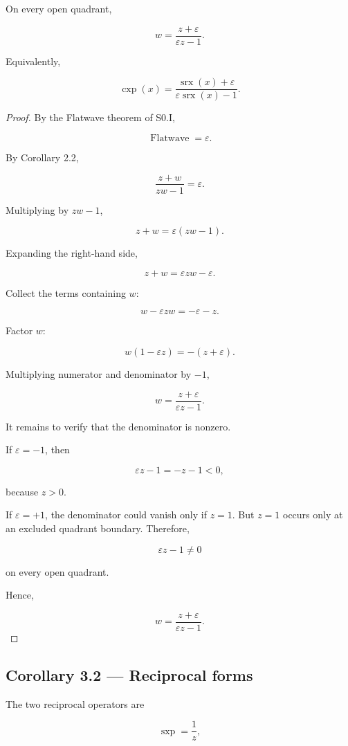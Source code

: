 \documentclass[11pt,oneside,openany]{book}
\newcommand{\PCsubsection}[1]{%
  \subsection*{#1}%
}
\begin{document}
On every open quadrant,

\[
\boxed{ w = \frac{z+\varepsilon} {\varepsilon z-1} }.
\]

Equivalently,

\[
\boxed{ \operatorname{cxp}(x) = \frac{\operatorname{srx}(x)+\varepsilon} {\varepsilon\operatorname{srx}(x)-1} }.
\]

\begin{proof}
By the Flatwave theorem of S0.I,

\[
\operatorname{Flatwave}=\varepsilon.
\]

By Corollary 2.2,

\[
\frac{z+w}{zw-1} = \varepsilon.
\]

Multiplying by \(zw-1\),

\[
z+w = \varepsilon(zw-1).
\]

Expanding the right-hand side,

\[
z+w = \varepsilon zw-\varepsilon.
\]

Collect the terms containing \(w\):

\[
w-\varepsilon zw = -\varepsilon-z.
\]

Factor \(w\):

\[
w(1-\varepsilon z) = -(z+\varepsilon).
\]

Multiplying numerator and denominator by \(-1\),

\[
w = \frac{z+\varepsilon} {\varepsilon z-1}.
\]

It remains to verify that the denominator is nonzero.

If \(\varepsilon=-1\), then

\[
\varepsilon z-1=-z-1<0,
\]

because \(z>0\).

If \(\varepsilon=+1\), the denominator could vanish only if \(z=1\). But \(z=1\) occurs only at an excluded quadrant boundary. Therefore,

\[
\varepsilon z-1\neq0
\]

on every open quadrant.

Hence,

\[
\boxed{ w = \frac{z+\varepsilon} {\varepsilon z-1} }.
\]

\end{proof}

\PCsubsection{Corollary 3.2 --- Reciprocal forms}

The two reciprocal operators are

\[
\boxed{ \operatorname{sxp} = \frac1z },
\]
\end{document}

